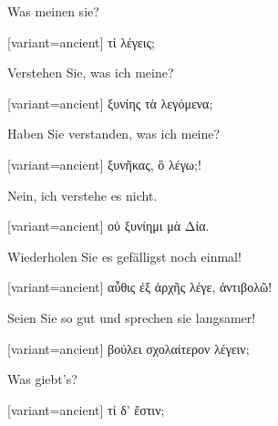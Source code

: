 Was meinen sie?

\switchcolumn

\begin{greek}[variant=ancient]%
τί λέγεις;

\end{greek}%
\switchcolumn*

Verstehen Sie, was ich meine?

\switchcolumn

\begin{greek}[variant=ancient]%
ξυνίης τὰ λεγόμενα;

\end{greek}%
\switchcolumn*

Haben Sie verstanden, was ich meine?

\switchcolumn

\begin{greek}[variant=ancient]%
ξυνῆκας, ὃ λέγω;!

\end{greek}%
\switchcolumn*

Nein, ich verstehe es nicht.

\switchcolumn

\begin{greek}[variant=ancient]%
οὐ ξυνίημι μὰ Δία.

\end{greek}%
\switchcolumn*

Wiederholen Sie es gefälligst noch einmal!

\switchcolumn

\begin{greek}[variant=ancient]%
αὖθις ἐξ ἀρχῆς λέγε, ἀντιβολῶ!

\end{greek}%
\switchcolumn*

Seien Sie so gut und sprechen sie langsamer!

\switchcolumn

\begin{greek}[variant=ancient]%
βούλει σχολαίτερον λέγειν;

\end{greek}%
\indent Was giebt's?

\switchcolumn

\begin{greek}[variant=ancient]%
τί δ' ἔστιν;

\end{greek}%
\switchcolumn*

